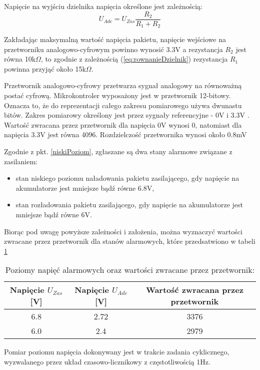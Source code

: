Napięcie na wyjściu dzielnika napięcia określone jest zależnością:
\begin{equation}
    U_{Adc}=U_{Zas}\frac{R_2}{R_1 + R_2}
    \label{eq:rownanieDzielnik}
\end{equation}

Zakładając maksymalną wartość napięcia pakietu, napięcie wejściowe na przetworniku analogowo-cyfrowym powinno wynosić 3.3V a rezystancja $R_2$ jest równa 10k$\Omega$, to zgodnie z zależnością (\ref{eq:rownanieDzielnik}) rezystancja $R_1$ powinna przyjąć około 15k$\Omega$.

Przetwornik analogowo-cyfrowy przetwarza sygnał analogowy na równoważną postać cyfrową. Mikrokontroler wyposażony jest w przetwornik 12-bitowy. Oznacza to, że do reprezentacji całego zakresu pomiarowego używa dwunastu bitów. Zakres pomiarowy określony jest przez sygnały referencyjne - 0V i 3.3V \cite{tiva}. Wartość zwracana przez przetwornik dla napięcia 0V wynosi 0, natomiast dla napięcia 3.3V jest równa 4096. Rozdzielczość przetwornika wynosi około 0.8mV

Zgodnie z pkt. \ref{niskiPoziom}, zgłaszane są dwa stany alarmowe związane z zasilaniem:
\begin{itemize}
\item
    stan niskiego poziomu naładowania pakietu zasilającego, gdy napięcie na akumulatorze jest mniejsze bądź równe 6.8V,
\item
    stan rozładowania pakietu zasilającego, gdy napięcie na akumulatorze jest mniejsze bądź równe 6V.
\end{itemize}

Biorąc pod uwagę powyższe zależności i założenia, można wyznaczyć wartości zwracane przez przetwornik dla stanów alarmowych, które przedsatwiono w tabeli \ref{tab:napieciaDwojnik}

\begin{table}[h]
    \caption{Poziomy napięć alarmowych oraz wartości zwracane przez przetwornik:}
    \begin{center}
		\label{tab:napieciaDwojnik}
		\begin{tabular}{|c|c|c|}
			\hline
 			\textbf{Napięcie $U_{Zas}$ [V]}& \textbf{Napięcie $U_{Adc}$ [V]}& \textbf{Wartość zwracana przez przetwornik} \\
 			\hline
 			6.8 & 2.72 & 3376 \\  
 			\hline
			6.0 & 2.4 & 2979 \\
			\hline
		\end{tabular}
	\end{center}
\end{table}

Pomiar poziomu napięcia dokonywany jest w trakcie zadania cyklicznego, wyzwalanego przez układ czasowo-licznikowy z częstotliwością 1Hz.




